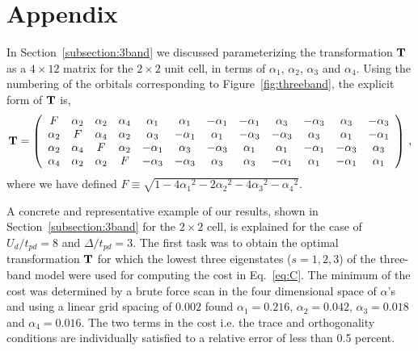 \documentclass[aps, prb, 11pt]{revtex4-1}
\begin{document}
\section*{Appendix}
In Section~\ref{subsection:3band} we discussed parameterizing the transformation ${\bf T}$ 
as a $4\times12$ matrix for the $2 \times 2$ unit cell, in terms of $\alpha_1$, $\alpha_2$, $\alpha_3$ 
and $\alpha_4$. Using the numbering of the orbitals corresponding to Figure~\ref{fig:threeband}, 
the explicit form of ${\bf T}$ is,
\begin{eqnarray}
{\bf T} = 
\left(
\begin{array}{cccccccccccc}
F        & \alpha_2 &        \alpha_2 &  \alpha_4 & \alpha_1 & \alpha_1 & -\alpha_1 & -\alpha_1 & \alpha_3 & -\alpha_3 & \alpha_3 & -\alpha_3 \\
\alpha_2 &  F       &        \alpha_4 &  \alpha_2 & \alpha_3 & -\alpha_1 & \alpha_1 & -\alpha_3 & -\alpha_3 & \alpha_3 & \alpha_1 & -\alpha_1 \\
\alpha_2 & \alpha_4 & F               &  \alpha_2 & -\alpha_1 & \alpha_3 & -\alpha_3 & \alpha_1 & \alpha_1 & -\alpha_1 & -\alpha_3 & \alpha_3 \\
\alpha_4 & \alpha_2 & \alpha_2        &   F       & -\alpha_3 & -\alpha_3 & \alpha_3 & \alpha_3 & -\alpha_1 & \alpha_1 & -\alpha_1 & \alpha_1 \\
\end{array}
\right)\,,
\end{eqnarray}
where we have defined $F \equiv \sqrt{1-4{\alpha_1}^2 - 2{\alpha_2}^2 - 4 {\alpha_3}^2 -{\alpha_4}^2}$.

A concrete and representative example of our results, shown in Section~\ref{subsection:3band} 
for the $2\times2$ cell, is explained for the case of $U_d/t_{pd}=8$ and $\Delta/t_{pd}=3$. 
The first task was to obtain the optimal transformation ${\bf T}$ 
for which the lowest three eigenstates ($s=1,2,3$) of the three-band model were used for 
computing the cost in Eq.~\eqref{eq:C}. The minimum of the cost was 
determined by a brute force scan in the four dimensional space of $\alpha$'s and 
using a linear grid spacing of $0.002$ found $\alpha_1=0.216$, $\alpha_2=0.042$, $\alpha_3=0.018$ and $\alpha_4=0.016$. 
The two terms in the cost i.e. the trace and orthogonality conditions are individually satisfied to a relative error of 
less than 0.5 percent. 
\end{document}
